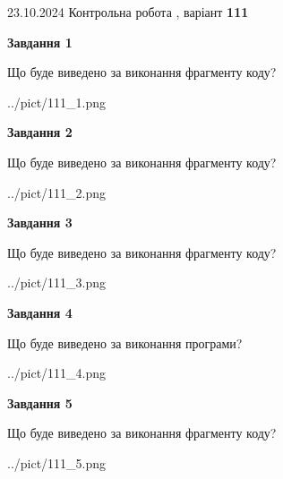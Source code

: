 \documentclass[12pt, ukrainian]{article}
\begin{document}
{\Large{23.10.2024 Контрольна робота , варіант  \No \textbf { 111 }\par}}
{
\begin {large}
{\begin {center}\textbf{Завдання 1}\end {center}}

Що буде виведено за виконання фрагменту коду?\par
\begin{center}
	{../pict/111_1.png}
\end{center}
\newpage

{\begin {center}\textbf{Завдання 2}\end {center}}

Що буде виведено за виконання фрагменту коду?\par
\begin{center}
	{../pict/111_2.png}
\end{center}
\newpage

{\begin {center}\textbf{Завдання 3}\end {center}}

Що буде виведено за виконання фрагменту коду?\par
\begin{center}
	{../pict/111_3.png}
\end{center}
\newpage

{\begin {center}\textbf{Завдання 4}\end {center}}

Що буде виведено за виконання програми?\par
\begin{center}
	{../pict/111_4.png}
\end{center}
\newpage

{\begin {center}\textbf{Завдання 5}\end {center}}

Що буде виведено за виконання фрагменту коду?\par
\begin{center}
	{../pict/111_5.png}
\end{center}
\newpage


\end{large}}
\end{document}
